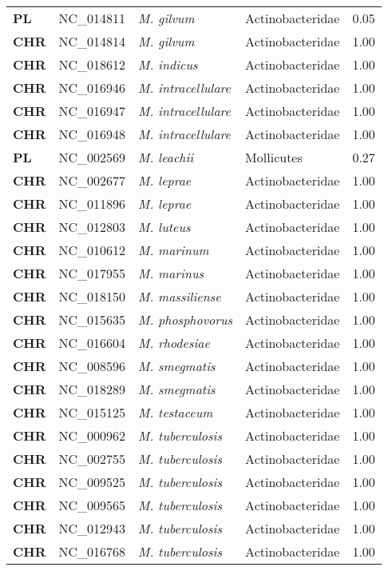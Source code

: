 \begin{adjustwidth}{-3cm}{2cm}
{\begin{supertabular}{>{\bfseries}l|p{0.1\textwidth}p{0.14\textwidth}l|l}
PL & NC\_014811 & \textit{M. gilvum} & Actinobacteridae & 0.05\\
CHR & NC\_014814 & \textit{M. gilvum} & Actinobacteridae & 1.00\\
CHR & NC\_018612 & \textit{M. indicus} & Actinobacteridae & 1.00\\
CHR & NC\_016946 & \textit{M. intracellulare} & Actinobacteridae & 1.00\\
CHR & NC\_016947 & \textit{M. intracellulare} & Actinobacteridae & 1.00\\
CHR & NC\_016948 & \textit{M. intracellulare} & Actinobacteridae & 1.00\\
PL & NC\_002569 & \textit{M. leachii} & Mollicutes & 0.27\\
CHR & NC\_002677 & \textit{M. leprae} & Actinobacteridae & 1.00\\
CHR & NC\_011896 & \textit{M. leprae} & Actinobacteridae & 1.00\\
CHR & NC\_012803 & \textit{M. luteus} & Actinobacteridae & 1.00\\
CHR & NC\_010612 & \textit{M. marinum} & Actinobacteridae & 1.00\\
CHR & NC\_017955 & \textit{M. marinus} & Actinobacteridae & 1.00\\
CHR & NC\_018150 & \textit{M. massiliense} & Actinobacteridae & 1.00\\
CHR & NC\_015635 & \textit{M. phosphovorus} & Actinobacteridae & 1.00\\
CHR & NC\_016604 & \textit{M. rhodesiae} & Actinobacteridae & 1.00\\
CHR & NC\_008596 & \textit{M. smegmatis} & Actinobacteridae & 1.00\\
CHR & NC\_018289 & \textit{M. smegmatis} & Actinobacteridae & 1.00\\
CHR & NC\_015125 & \textit{M. testaceum} & Actinobacteridae & 1.00\\
CHR & NC\_000962 & \textit{M. tuberculosis} & Actinobacteridae & 1.00\\
CHR & NC\_002755 & \textit{M. tuberculosis} & Actinobacteridae & 1.00\\
CHR & NC\_009525 & \textit{M. tuberculosis} & Actinobacteridae & 1.00\\
CHR & NC\_009565 & \textit{M. tuberculosis} & Actinobacteridae & 1.00\\
CHR & NC\_012943 & \textit{M. tuberculosis} & Actinobacteridae & 1.00\\
CHR & NC\_016768 & \textit{M. tuberculosis} & Actinobacteridae & 1.00\\

\end{supertabular}}
\end{adjustwidth}
